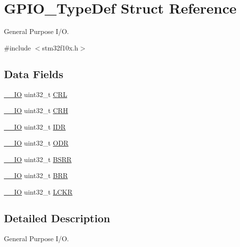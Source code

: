 \hypertarget{struct_g_p_i_o___type_def}{}\section{G\+P\+I\+O\+\_\+\+Type\+Def Struct Reference}
\label{struct_g_p_i_o___type_def}


General Purpose I/O.  




{\ttfamily \#include $<$stm32f10x.\+h$>$}

\subsection*{Data Fields}
\begin{DoxyCompactItemize}
\item 
\mbox{\hyperlink{core__sc300_8h_aec43007d9998a0a0e01faede4133d6be}{\+\_\+\+\_\+\+IO}} uint32\+\_\+t \mbox{\hyperlink{struct_g_p_i_o___type_def_ae3e1b95965ce8c9f06490047cb9967a9}{C\+RL}}
\item 
\mbox{\hyperlink{core__sc300_8h_aec43007d9998a0a0e01faede4133d6be}{\+\_\+\+\_\+\+IO}} uint32\+\_\+t \mbox{\hyperlink{struct_g_p_i_o___type_def_acc2f82d559cfd955b5a68c1b54c5fc35}{C\+RH}}
\item 
\mbox{\hyperlink{core__sc300_8h_aec43007d9998a0a0e01faede4133d6be}{\+\_\+\+\_\+\+IO}} uint32\+\_\+t \mbox{\hyperlink{struct_g_p_i_o___type_def_a328d2fe9ef1d513c3a97d30f98f0047c}{I\+DR}}
\item 
\mbox{\hyperlink{core__sc300_8h_aec43007d9998a0a0e01faede4133d6be}{\+\_\+\+\_\+\+IO}} uint32\+\_\+t \mbox{\hyperlink{struct_g_p_i_o___type_def_abff7fffd2b5a718715a130006590c75c}{O\+DR}}
\item 
\mbox{\hyperlink{core__sc300_8h_aec43007d9998a0a0e01faede4133d6be}{\+\_\+\+\_\+\+IO}} uint32\+\_\+t \mbox{\hyperlink{struct_g_p_i_o___type_def_ac25dd6b9e3d55e17589195b461c5ec80}{B\+S\+RR}}
\item 
\mbox{\hyperlink{core__sc300_8h_aec43007d9998a0a0e01faede4133d6be}{\+\_\+\+\_\+\+IO}} uint32\+\_\+t \mbox{\hyperlink{struct_g_p_i_o___type_def_a092e59d908b2ca112e31047e942340cb}{B\+RR}}
\item 
\mbox{\hyperlink{core__sc300_8h_aec43007d9998a0a0e01faede4133d6be}{\+\_\+\+\_\+\+IO}} uint32\+\_\+t \mbox{\hyperlink{struct_g_p_i_o___type_def_a2612a0f4b3fbdbb6293f6dc70105e190}{L\+C\+KR}}
\end{DoxyCompactItemize}


\subsection{Detailed Description}
General Purpose I/O. 

